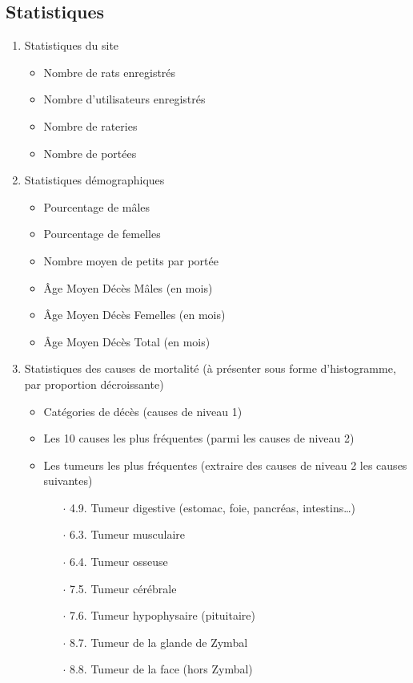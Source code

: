 \documentclass[a4paper,10pt]{article}
\begin{document}
\subsection{Statistiques}
\label{app:stats}

\begin{enumerate}
\item Statistiques du site
\begin{itemize}
\item Nombre de rats enregistrés
\item Nombre d'utilisateurs enregistrés
\item Nombre de rateries
\item Nombre de portées
\end{itemize}
\item Statistiques démographiques
\begin{itemize}
\item Pourcentage de mâles
\item Pourcentage de femelles
\item Nombre moyen de petits par portée
\item Âge Moyen Décès Mâles (en mois)
\item Âge Moyen Décès Femelles (en mois)
\item Âge Moyen Décès Total (en mois)
\end{itemize}
\item Statistiques des causes de mortalité (à présenter sous forme d'histogramme, par proportion décroissante)
\begin{itemize}
\item Catégories de décès (causes de niveau 1)
\item Les 10 causes les plus fréquentes (parmi les causes de niveau 2)
\item Les tumeurs les plus fréquentes (extraire des causes de niveau 2 les causes suivantes)
 \begin{itemize}
\item[$\cdot$ 4.9.]Tumeur digestive (estomac, foie, pancréas, intestins…)
\item[$\cdot$ 6.3.]Tumeur musculaire
\item[$\cdot$ 6.4.]Tumeur osseuse
\item[$\cdot$ 7.5.]Tumeur cérébrale
\item[$\cdot$ 7.6.]Tumeur hypophysaire (pituitaire)
\item[$\cdot$ 8.7.]Tumeur de la glande de Zymbal
\item[$\cdot$ 8.8.]Tumeur de la face (hors Zymbal)

\end{itemize}
\end{itemize}
\end{enumerate}
\end{document}
